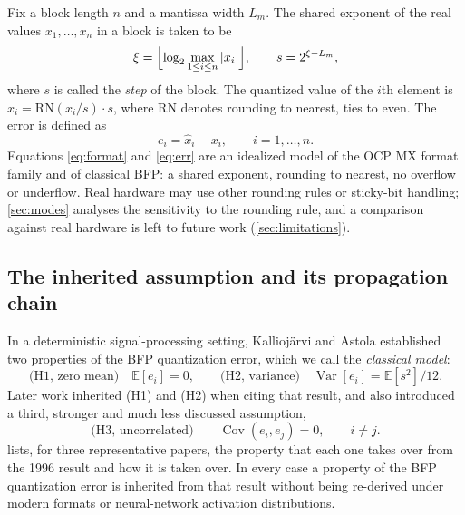 \documentclass[twocolumn,review,hidelinks,oneeqnum,onetabnum,onefignum,onethmnum]{siamart251216}
\begin{document}
Fix a block length $n$ and a mantissa width $L_m$. The shared exponent of the
real values $x_1,\dots,x_n$ in a block is taken to be
\begin{equation}
\xi=\Bigl\lfloor \log_2 \max_{1\le i\le n}|x_i|\Bigr\rfloor ,
\qquad
s=2^{\xi-L_m},
\label{eq:format}
\end{equation}
where $s$ is called the \emph{step} of the block. The quantized value of the
$i$th element is $\hat x_i=\mathrm{RN}(x_i/s)\cdot s$, where $\mathrm{RN}$
denotes rounding to nearest, ties to even. The error is defined as
\begin{equation}
e_i=\hat x_i-x_i,\qquad i=1,\dots,n .
\label{eq:err}
\end{equation}
Equations \cref{eq:format} and \cref{eq:err} are an idealized model of the OCP
MX format family and of classical BFP: a shared exponent, rounding to nearest,
no overflow or underflow. Real hardware may use other rounding rules or
sticky-bit handling; \cref{sec:modes} analyses the sensitivity to the rounding
rule, and a comparison against real hardware is left to future work
(\cref{sec:limitations}).

\subsection{The inherited assumption and its propagation chain}

In a deterministic signal-processing setting, Kallioj\"arvi and Astola
\cite{kalliojarvi1996} established two properties of the BFP quantization error,
which we call the \emph{classical model}:
\begin{equation}
\text{(H1, zero mean)}\quad \mathbb{E}[e_i]=0,\qquad
\text{(H2, variance)}\quad \operatorname{Var}[e_i]=\mathbb{E}[s^2]/12 .
\label{eq:H1H2}
\end{equation}
Later work inherited (H1) and (H2) when citing that result, and also introduced a
third, stronger and much less discussed assumption,
\begin{equation}
\text{(H3, uncorrelated)}\qquad \operatorname{Cov}(e_i,e_j)=0,\qquad i\ne j .
\label{eq:H3}
\end{equation}
 lists, for three representative papers, the property that each
one takes over from the 1996 result and how it is taken over. In every case a
property of the BFP quantization error is inherited from that result without
being re-derived under modern formats or neural-network activation
distributions.
\end{document}
